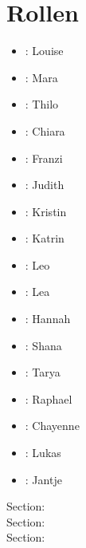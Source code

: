 \pagebreak

\section{Rollen}
\begin{multicols}{2}
\begin{itemize}
\item \milamh: Louise
\item \miladh: Mara
\item \alberth: Thilo
\item \wilmah: Chiara
\item \wilhelminah: Franzi
\item \salomeh: Judith
\item \cosmah: Kristin
\item \mutterh: Katrin
\item \leonh: Leo
\item \lenah: Lea
\item \charlotteh: Hannah
\item \sophiah: Shana
\item \emmah: Tarya
\item \aaronh: Raphael
\item \cleoh: Chayenne
\item \theoh: Lukas
\item \pikachuh: Jantje
\end{itemize}
\end{multicols}

%


\usehyperlinkstrue
\ListOfPersons

Section: \thesection\\

Section: \thesection\\

Section: \thesection\\



